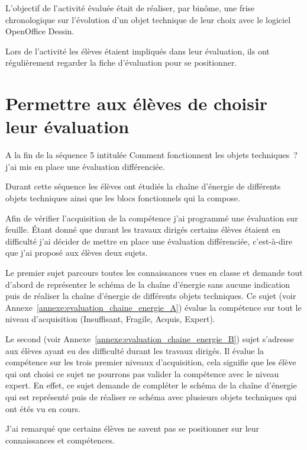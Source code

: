 L'objectif de l'activité évaluée était de réaliser, par binôme, une frise chronologique sur l'évolution d'un objet technique de leur choix avec le logiciel OpenOffice Dessin.

Lors de l'activité les élèves étaient impliqués dans leur évaluation, ils ont régulièrement regarder la fiche d'évaluation pour se positionner.


\section{Permettre aux élèves de choisir leur évaluation}

A la fin de la séquence 5 intitulée \og Comment fonctionnent les objets techniques~?\fg j'ai mis en place une évaluation différenciée.

Durant cette séquence les élèves ont étudiés la chaîne d'énergie de différents objets techniques ainsi que les blocs fonctionnels qui la compose.

Afin de vérifier l'acquisition de la compétence j'ai programmé une évaluation sur feuille.
Étant donné que durant les travaux dirigés certains élèves étaient en difficulté j'ai décider de mettre en place une évaluation différenciée, c'est-à-dire que j'ai proposé aux élèves deux sujets.

Le premier sujet parcours toutes les connaissances vues en classe et demande tout d'abord de représenter le schéma de la chaîne d'énergie sans aucune indication puis de réaliser la chaîne d'énergie de différents objets techniques.
Ce sujet (voir Annexe~\ref{annexe:evaluation_chaine_energie_A}) évalue la compétence sur tout le niveau d'acquisition (Insuffisant, Fragile, Acquis, Expert).

Le second (voir Annexe~\ref{annexe:evaluation_chaine_energie_B}) sujet s'adresse aux élèves ayant eu des difficulté durant les travaux dirigés.
Il évalue la compétence sur les trois premier niveaux d'acquisition, cela signifie que les élève qui ont choisi ce sujet ne pourrons pas valider la compétence avec le niveau expert.
En effet, ce sujet demande de compléter le schéma de la chaîne d'énergie qui est représenté puis de réaliser ce schéma avec plusieurs objets techniques qui ont étés vu en cours.



J'ai remarqué que certains élèves ne savent pas se positionner sur leur connaissances et compétences.





